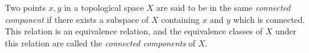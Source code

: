 \documentclass{article}
\begin{document}
Two points $x,y$ in a topological space $X$ are said to be in the same {\em connected component} if there exists a subspace of $X$ containing $x$ and $y$ which is connected. This relation is an equivalence relation, and the equivalence classes of $X$ under this relation are called the {\em connected components} of $X$.
\end{document}
